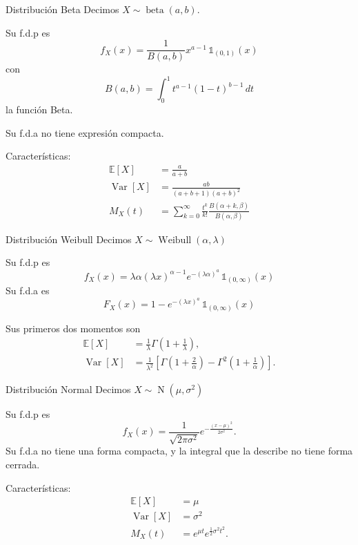 \documentclass[a4paper]{article}
\theoremstyle{mytheoremstyle}
\newcommand{\E}{\mathbb{E}}
\newcommand{\1}{\mathds{1}}
\DeclareMathOperator{\Var}{Var}
\DeclareMathOperator{\dbeta}{beta}
\DeclareMathOperator{\Weibull}{Weibull}
\DeclareMathOperator{\dnormal}{N}
\begin{document}
\begin{multicols*}{3}
\begin{roundbox}{Distribución Beta}
    Decimos $X \sim \dbeta(a,b).$

    Su f.d.p es 
    \[
        f_X(x) = \frac{1}{B(a,b)} x^{a-1} \, \1_{(0,1)}(x)
    \]
    con 
    \[
        B(a,b) = \int_{0}^{1} t^{a-1} (1-t)^{b-1} \, dt  
    \]
    la función Beta.

    Su f.d.a no tiene expresión compacta.

    Características:
    \begin{align*}
        \E[X] &= \frac{a}{a+b} \\
        \Var[X] &= \frac{ab}{(a+b+1)(a+b)^{2}} \\
        M_{X}(t)&=\sum_{k=0}^{\infty} \frac{t^{k}}{k !} \frac{B(\alpha+k, \beta)}{B(\alpha, \beta)}
    \end{align*}
\end{roundbox}

\begin{roundbox}{Distribución Weibull}
    Decimos $X \sim \Weibull(\alpha, \lambda)$

    Su f.d.p es 
    \[
        f_X(x) = \lambda \alpha (\lambda x)^{\alpha -1} e^{-(\lambda \alpha)^{a}} \, \1_{(0,\infty)}(x)
    \]
    Su f.d.a es
    \[
        F_X(x) = 1 - e^{-(\lambda x)^{a}} \, \1_{(0, \infty)}(x)  
    \]

    Sus primeros dos momentos son
    \begin{align*}
        \E[X] &= \frac{1}{\lambda} \Gamma\left(1 + \frac{1}{\lambda}\right), \\
        \Var[X] &= \frac{1}{\lambda^2} \left[ \Gamma\left(1 + \frac{2}{\alpha}\right) - \Gamma^{2} \left( 1 + \frac{1}{\alpha}\right) \right].
    \end{align*}
\end{roundbox}

\begin{roundbox}{Distribución Normal}
    Decimos $X \sim \dnormal(\mu, \sigma^2)$

    Su f.d.p es 
    \[
        f_X(x) = \frac{1}{\sqrt{2 \pi \sigma^{2}}} e^{- \frac{(x-\mu)^{2}}{2 \sigma^2}}.
    \]
    Su f.d.a no tiene una forma compacta, y la integral que la describe no tiene forma cerrada.

    Características:
    \begin{align*}
        \E[X] &= \mu \\
        \Var[X] &= \sigma^2 \\
        M_X(t) &= e^{\mu t} e^{\frac{1}{2} \sigma^2 t^2}.
    \end{align*}


\end{roundbox}
\end{multicols*}
\end{document}
